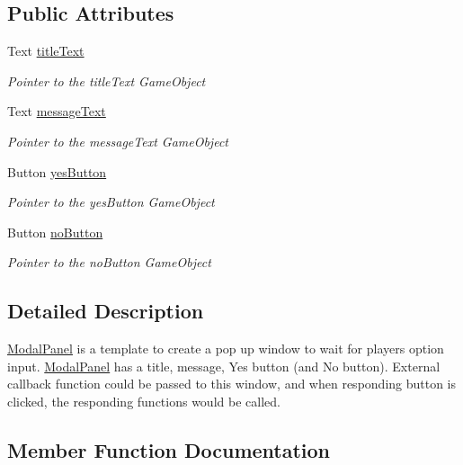 \subsection*{Public Attributes}
\begin{DoxyCompactItemize}
\item 
Text \hyperlink{class_modal_panel_a372eb52ee36c5bd204ca4659bc0f2e8c}{title\+Text}
\begin{DoxyCompactList}\small\item\em Pointer to the title\+Text Game\+Object \end{DoxyCompactList}\item 
Text \hyperlink{class_modal_panel_aa0f1e1e45589f671cba12b0f05647a77}{message\+Text}
\begin{DoxyCompactList}\small\item\em Pointer to the message\+Text Game\+Object \end{DoxyCompactList}\item 
Button \hyperlink{class_modal_panel_ad03ef3b69d09cf3c4b6a9d309bb7401d}{yes\+Button}
\begin{DoxyCompactList}\small\item\em Pointer to the yes\+Button Game\+Object \end{DoxyCompactList}\item 
Button \hyperlink{class_modal_panel_a87f88998d90ba4c3c07bd7fb9aac6d58}{no\+Button}
\begin{DoxyCompactList}\small\item\em Pointer to the no\+Button Game\+Object \end{DoxyCompactList}\end{DoxyCompactItemize}


\subsection{Detailed Description}
\hyperlink{class_modal_panel}{Modal\+Panel} is a template to create a pop up window to wait for player\textquotesingle{}s option input. \hyperlink{class_modal_panel}{Modal\+Panel} has a title, message, Yes button (and No button). External callback function could be passed to this window, and when responding button is clicked, the responding functions would be called. 



\subsection{Member Function Documentation}
